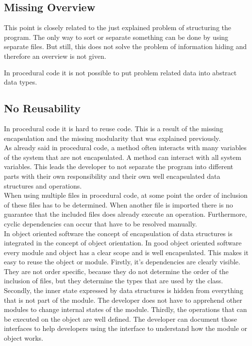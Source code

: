 \subsection*{Missing Overview}
This point is closely related to the just explained problem of structuring the program. The only way to sort or separate something can be done by using separate files. But still, this does not solve the problem of information hiding and therefore an overview is not given.

In procedural code it is not possible to put problem related data into abstract data types.

\subsection*{No Reusability}
In procedural code it is hard to reuse code. This is a result of the missing encapsulation and the missing modularity that was explained previously.\\

As already said in procedural code, a method often interacts with many variables of the system that are not encapsulated. A method can interact with all system variables. This leads the developer to not separate the program into different parts with their own responsibility and their own well encapsulated data structures and operations. \\

When using multiple files in procedural code, at some point the order of inclusion of these files has to be determined. When another file is imported there is no guarantee that the included files does already execute an operation. Furthermore, cyclic dependencies can occur that have to be resolved manually. \\

In object oriented software the concept of encapsulation of data structures is integrated in the concept of object orientation.  In good object oriented software every module and object has a clear scope and is well encapsulated. This makes it easy to reuse the object or module. Firstly, it's dependencies are clearly visible. They are not order specific, because they do not determine the order of the inclusion of files, but they determine the types that are used by the class. Secondly, the inner state expressed by data structures is hidden from everything that is not part of the module. The developer does not have to apprehend other modules to change internal states of the module. Thirdly, the operations that can be executed on the object are well defined. The developer can document those interfaces to help developers using the interface to understand how the module or object works.

